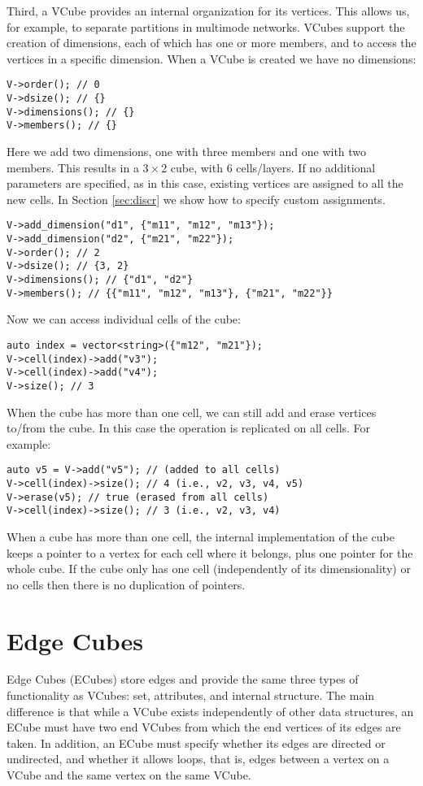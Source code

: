 Third, a VCube provides an internal organization for its vertices. This allows us, for example, to separate partitions in multimode networks. VCubes support the creation of dimensions, each of which has one or more members, and to access the vertices in a specific dimension. When a VCube is created we have no dimensions:
\begin{lstlisting}[style=c++]
V->order(); // 0
V->dsize(); // {}
V->dimensions(); // {}
V->members(); // {}
\end{lstlisting}
Here we add two dimensions, one with three members and one with two members. This results in a $3 \times 2$ cube, with 6 cells/layers. If no additional parameters are specified, as in this case, existing vertices are assigned to all the new cells. In Section \ref{sec:discr} we show how to  specify custom assignments.
\begin{lstlisting}[style=c++]
V->add_dimension("d1", {"m11", "m12", "m13"});
V->add_dimension("d2", {"m21", "m22"});
V->order(); // 2
V->dsize(); // {3, 2}
V->dimensions(); // {"d1", "d2"}
V->members(); // {{"m11", "m12", "m13"}, {"m21", "m22"}}
\end{lstlisting}
Now we can access individual cells of the cube:
 \begin{lstlisting}[style=c++]
auto index = vector<string>({"m12", "m21"});
V->cell(index)->add("v3");
V->cell(index)->add("v4");
V->size(); // 3
\end{lstlisting}
When the cube has more than one cell, we can still add and erase vertices to/from the cube. In this case the operation is replicated on all cells. For example:
\begin{lstlisting}[style=c++]
auto v5 = V->add("v5"); // (added to all cells)
V->cell(index)->size(); // 4 (i.e., v2, v3, v4, v5)
V->erase(v5); // true (erased from all cells)
V->cell(index)->size(); // 3 (i.e., v2, v3, v4)
\end{lstlisting}
When a cube has more than one cell, the internal implementation of the cube keeps a pointer to a vertex for each cell where it belongs, plus one pointer for the whole cube. If the cube only has one cell (independently of its dimensionality) or no cells then there is no duplication of pointers.

\section{Edge Cubes}

Edge Cubes (ECubes) store edges and provide the same three types of functionality as VCubes: set, attributes, and internal structure. The main difference is that while a VCube exists independently of other data structures, an ECube must have two end VCubes from which the end vertices of its edges are taken. In addition, an ECube must specify whether its edges are directed or undirected, and whether it allows loops, that is, edges between a vertex on a VCube and the same vertex on the same VCube.

